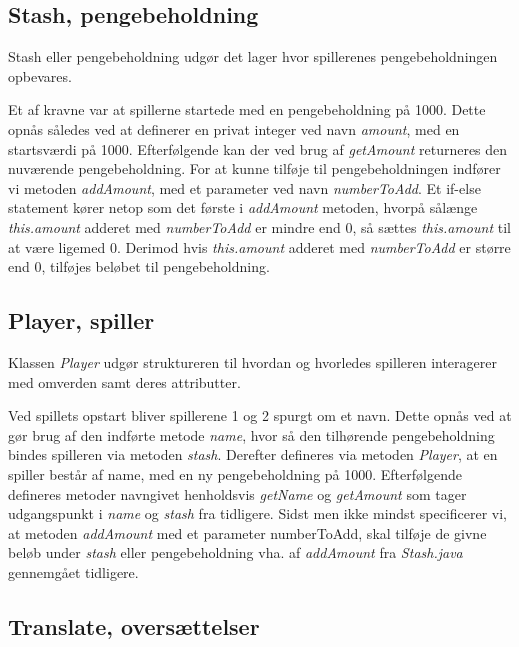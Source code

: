 \subsection{Stash, pengebeholdning}
\noindent Stash eller pengebeholdning udgør det lager hvor spillerenes pengebeholdningen opbevares. 

\noindent Et af kravne var at spillerne startede med en pengebeholdning på 1000.
Dette opnås således ved at definerer en privat integer ved navn \textit{amount}, med en startsværdi på 1000.
Efterfølgende kan der ved brug af \textit{getAmount} returneres den nuværende pengebeholdning.
For at kunne tilføje til pengebeholdningen indfører vi metoden \textit{addAmount}, med et parameter ved navn \textit{numberToAdd}.
Et if-else statement kører netop som det første i \textit{addAmount} metoden, hvorpå sålænge \textit{this.amount} adderet med \textit{numberToAdd} er mindre end 0, så sættes \textit{this.amount} til at være ligemed 0.
Derimod hvis \textit{this.amount} adderet med \textit{numberToAdd} er større end 0, tilføjes beløbet til pengebeholdning.\\

\subsection{Player, spiller}
\noindent Klassen \textit{Player} udgør struktureren til hvordan og hvorledes spilleren interagerer med omverden samt deres attributter.

\noindent Ved spillets opstart bliver spillerene 1 og 2 spurgt om et navn.
Dette opnås ved at gør brug af den indførte metode \textit{name}, hvor så den tilhørende pengebeholdning bindes spilleren via metoden \textit{stash}.
Derefter defineres via metoden \textit{Player}, at en spiller består af name, med en ny pengebeholdning på 1000.
Efterfølgende defineres metoder navngivet henholdsvis \textit{getName} og \textit{getAmount} som tager udgangspunkt i \textit{name} og \textit{stash} fra tidligere.
Sidst men ikke mindst specificerer vi, at metoden \textit{addAmount} med et parameter {numberToAdd}, skal tilføje de givne beløb under \textit{stash} eller pengebeholdning vha. af \textit{addAmount} fra \textit{Stash.java} gennemgået tidligere.\\


\subsection{Translate, oversættelser}

